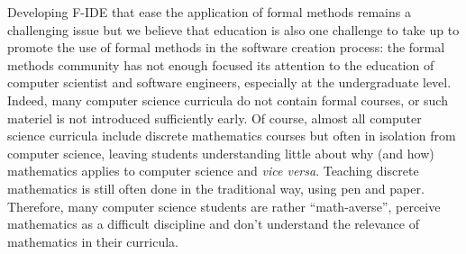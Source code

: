 \documentclass[submission,copyright,creativecommons]{eptcs}
\begin{document}
Developing F-IDE that ease the application of
formal methods remains a challenging issue but we believe that education is
also one challenge to take up to promote the use of formal methods in
the software creation process:
the formal methods community has not enough focused its
attention to the education of computer scientist and software
engineers, especially at the undergraduate level.
Indeed, many computer science curricula
do not contain formal courses, or such 
materiel is not introduced sufficiently early. 
Of course, almost all computer science curricula include discrete mathematics courses but
often in isolation from computer science, leaving students
understanding little about why (and how) mathematics applies to computer science
and {\it vice versa}. 
Teaching discrete mathematics is still often done in the traditional
way, using pen and paper.
Therefore, many computer science students are rather
``math-averse'', perceive mathematics as a difficult discipline and
don't  understand the relevance of mathematics in their curricula.
\end{document}
